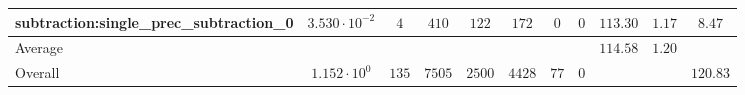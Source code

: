 \begin{tabular}{|l|c|c|c|c|c|c|c|c|c|c|}
subtraction:single\_prec\_subtraction\_0         & $ 3.530 \cdot 10^{-2} $ & $ 4      $ & $ 410  $ & $ 122  $ & $ 172   $ & $ 0  $ & $ 0 $ & $ 113.30      $ & $ 1.17    $ & $ 8.47    $ \\
\hline
Average                                          & $                     $ & $        $ & $      $ & $      $ & $       $ & $    $ & $   $ & $ 114.58      $ & $ 1.20    $ & $         $ \\
\hline
Overall                                          & $ 1.152 \cdot 10^{0}  $ & $ 135    $ & $ 7505 $ & $ 2500 $ & $ 4428  $ & $ 77 $ & $ 0 $ & $             $ & $         $ & $ 120.83  $ \\
\hline
\end{tabular}
